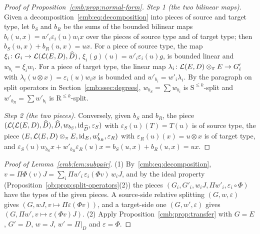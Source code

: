 \begin{proof}[Proof of Proposition~\ref{cmb:prop:normal-form}]
\emph{Step 1 (the two bilinear maps).} Given a decomposition~\eqref{cmb:eq:decomposition} into pieces of source and
target type, let $b_S$ and $b_R$ be the sums of the bounded bilinear maps $b_i(u,x)=w'_i\varepsilon_i(u)w_ix$ over the
pieces of source type and of target type; then $b_S(u,x)+b_R(u,x)=ux$. For a piece of source type, the map
$\xi_i\colon G_i\to\mathcal L(\mathcal L(E,D),\widehat D)$, $\xi_i(g)(u)=w'_i\varepsilon_i(u)g$, is bounded linear and
$w_{b_i}=\xi_iw_i$. For a piece of target type, the linear map $\lambda_i\colon\mathcal L(E,D)\otimes_\pi E\to G'_i$ with
$\lambda_i(u\otimes x)=\varepsilon_i(u)w_ix$ is bounded and $w'_{b_i}=w'_i\lambda_i$. By the paragraph on split operators
in Section~\ref{cmb:ssec:degrees}, $w_{b_S}=\sum w_{b_i}$ is $\mathrm S^{\le k}$-split and $w'_{b_R}=\sum w'_{b_i}$ is
$\mathrm R^{\le k}$-split.

\emph{Step 2 (the two pieces).} Conversely, given $b_S$ and $b_R$, the piece
$(\mathcal L(\mathcal L(E,D),\widehat D),\widehat D,w_{b_S},\mathrm{id}_{\widehat D},\varepsilon_S)$ with $\varepsilon_S(u)(T)=T(u)$ is of
source type, the piece $(E,\mathcal L(E,D)\otimes_\pi E,\mathrm{id}_E,w'_{b_R},\varepsilon_R)$ with $\varepsilon_R(u)(x)=u\otimes x$ is
of target type, and $\varepsilon_S(u)w_{b_S}x+w'_{b_R}\varepsilon_R(u)x=b_S(u,x)+b_R(u,x)=ux$.
\end{proof}

\begin{proof}[Proof of Lemma~\ref{cmb:lem:subpair}]
(1) By~\eqref{cmb:eq:decomposition}, $v=\Pi\Phi(v)J=\sum_i\Pi w'_i\,\varepsilon_i(\Phi v)\,w_iJ$, and by the ideal property
(Proposition~\ref{ob:prop:split-operators}(2)) the pieces $(G_i,G'_i,w_iJ,\Pi w'_i,\varepsilon_i\circ\Phi)$ have the types
of the given pieces. A source-side relative splitting $(G,w,\varepsilon)$ gives $(G,wJ,v\mapsto\Pi\varepsilon(\Phi v))$,
and a target-side one $(G,w',\varepsilon)$ gives $(G,\Pi w',v\mapsto\varepsilon(\Phi v)J)$. (2) Apply
Proposition~\ref{cmb:prop:transfer} with $G=E$, $G'=D$, $w=J$, $w'=\Pi|_D$ and $\varepsilon=\Phi$.
\end{proof}

